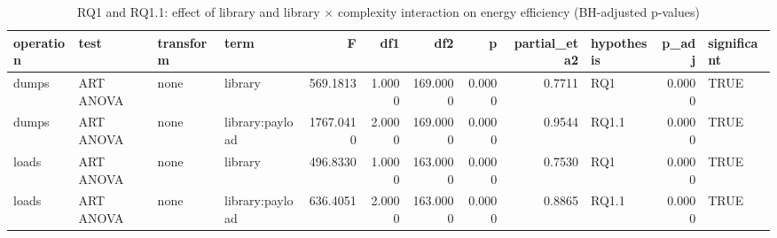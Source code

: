 \begin{table}[ht]
\centering
\begin{tabular}{llllrrrrrlrl}
  \toprule
operation & test & transform & term & F & df1 & df2 & p & partial\_eta2 & hypothesis & p\_adj & significant \\ 
  \midrule
dumps & ART ANOVA & none & library & 569.1813 & 1.0000 & 169.0000 & 0.0000 & 0.7711 & RQ1 & 0.0000 & TRUE \\ 
  dumps & ART ANOVA & none & library:payload & 1767.0410 & 2.0000 & 169.0000 & 0.0000 & 0.9544 & RQ1.1 & 0.0000 & TRUE \\ 
  loads & ART ANOVA & none & library & 496.8330 & 1.0000 & 163.0000 & 0.0000 & 0.7530 & RQ1 & 0.0000 & TRUE \\ 
  loads & ART ANOVA & none & library:payload & 636.4051 & 2.0000 & 163.0000 & 0.0000 & 0.8865 & RQ1.1 & 0.0000 & TRUE \\ 
   \bottomrule
\end{tabular}
\caption{RQ1 and RQ1.1: effect of library and library $\times$ complexity interaction on energy efficiency (BH-adjusted p-values)} 
\label{tab:rq1_anova}
\end{table}
